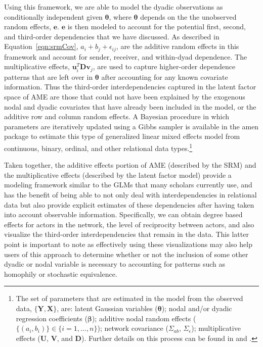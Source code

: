 \documentclass[12pt,pdflatex]{elsarticle}
\newcommand{\pkg}[1]{{\fontseries{b}\selectfont #1}}
\begin{document}
Using this framework, we are able to model the dyadic observations as conditionally independent given $\bm\theta$, where $\bm\theta$ depends on the the unobserved random effects, $\mathbf{e}$. $\mathbf{e}$ is then modeled to account for the potential first, second, and third-order dependencies that we have discussed. As described in Equation~\ref{eqn:srmCov}, $a_{i} + b_{j}  + \epsilon_{ij}$, are the additive random effects in this framework and account for sender, receiver, and within-dyad dependence. The multiplicative effects, $\textbf{u}_{i}^{T} \textbf{D} \textbf{v}_{j}$, are used to capture higher-order dependence patterns that are left over in $\bm\theta$ after accounting for any known covariate information. Thus the third-order interdependencies captured in the latent factor space of AME are those that could not have been explained by the exogenous nodal and dyadic covariates that have already been included in the model, or the additive row and column random effects. A Bayesian procedure in which parameters are iteratively updated using a Gibbs sampler is available in the \pkg{amen} package to estimate this type of generalized linear mixed effects model from continuous, binary, ordinal, and other relational data types.\footnote{The set of parameters that are estimated in the model from the observed data, $\{\mathbf{Y}, \mathbf{X}\}$, are: latent Gaussian variables ($\bm\theta$); nodal and/or dyadic regression coefficients ($\bm\beta$); additive nodal random effects ($\{(a_{i},b_{i})\} \in \{i=1, \ldots, n \}$); network covariance ($\Sigma_{ab},\, \Sigma_{\epsilon}$); multiplicative effects ($\mathbf{U}$, $\mathbf{V}$, and $\mathbf{D}$). Further details on this process can be found in \citet{hoff:2005} and \citet{hoff:2009}.}

Taken together, the additive effects portion of AME (described by the SRM) and the multiplicative effects (described by the latent factor model) provide a modeling framework similar to the GLMs that many scholars currently use, and has the benefit of being able to not only deal with interdependencies in relational data but also provide explicit estimates of these dependencies after having taken into account observable information. Specifically, we can obtain degree based effects for actors in the network, the level of reciprocity between actors, and also visualize the third-order interdependencies that remain in the data. This latter point is important to note as effectively using these visualizations may also help users of this approach to determine whether or not the inclusion of some other dyadic or nodal variable is necessary to accounting for patterns such as homophily or stochastic equivalence. 
\end{document}
